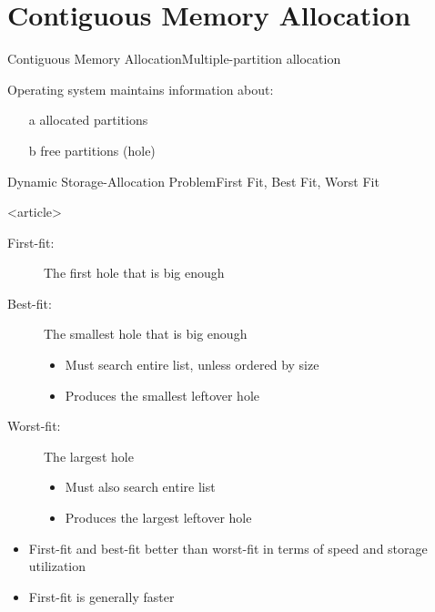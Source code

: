 \section{Contiguous Memory Allocation}

\begin{frame}{Contiguous Memory Allocation}{Multiple-partition allocation}
  \begin{center}
  \end{center}
  Operating system maintains information about:
  \begin{itemize}
  \item[a] allocated partitions
  \item[b] free partitions (hole)
  \end{itemize}
\end{frame}

\begin{frame}{Dynamic Storage-Allocation Problem}{First Fit, Best Fit, Worst Fit}
  \centering
  \mode<beamer>{ \texttt{[image: mm-fit]} }%
\end{frame}

\begin{frame}<article>%
  \begin{description}
  \item[First-fit:] The first hole that is big enough
  \item[Best-fit:] The smallest hole that is big enough
    \begin{itemize}
    \item Must search entire list, unless ordered by size
    \item Produces the smallest leftover hole
    \end{itemize}
  \item[Worst-fit:] The largest hole
    \begin{itemize}
    \item Must also search entire list
    \item Produces the largest leftover hole
    \end{itemize}
  \end{description}
  \begin{itemize}
  \item First-fit and best-fit better than worst-fit in terms of speed and storage
    utilization
  \item First-fit is generally faster
  \end{itemize}
\end{frame}

